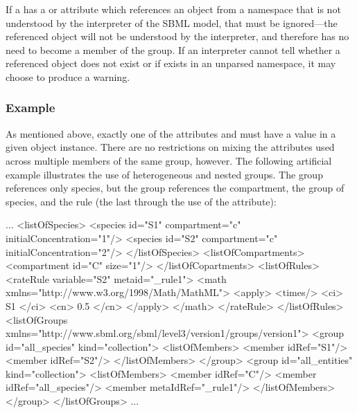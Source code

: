 If a \Member has a  or  attribute which references an object from a namespace that is not understood by the interpreter of the SBML model, that \Member must be ignored---the referenced object will not be understood by the interpreter, and therefore has no need to become a member of the group. If an interpreter cannot tell whether a referenced object does not exist or if exists in an unparsed namespace, it may choose to produce a warning.


\subsubsection{Example}

As mentioned above, exactly one of the attributes  and  must have a value in a given \Member object instance.  There are no restrictions on mixing the attributes used across multiple members of the same group, however.  The following artificial example illustrates the use of heterogeneous and nested groups.  The group  references only species, but the group  references the compartment, the group of species, and the rule (the last through the use of the  attribute):

\begin{example}
...
  <listOfSpecies>     
      <species id="S1" compartment="c" initialConcentration="1"/> 
      <species id="S2" compartment="c" initialConcentration="2"/> 
  </listOfSpecies>   
  <listOfCompartments>   
      <compartment id="C" size="1"/>
  </listOfCopartments>   
  <listOfRules>
      <rateRule variable="S2" metaid="_rule1">
          <math xmlns="http://www.w3.org/1998/Math/MathML">
              <apply>
                  <times/>
                  <ci> S1 </ci>
                  <cn> 0.5 </cn>
              </apply>
          </math>
      </rateRule>
  </listOfRules>
  <listOfGroups xmlns="http://www.sbml.org/sbml/level3/version1/groups/version1">   
      <group id="all_species" kind="collection">
          <listOfMembers>
              <member idRef="S1"/> 
              <member idRef="S2"/> 
          </listOfMembers>
      </group> 
      <group id="all_entities" kind="collection">
          <listOfMembers>
              <member idRef="C"/> 
              <member idRef="all_species"/> 
              <member metaIdRef="_rule1"/> 
          </listOfMembers>
      </group> 
  </listOfGroups>   
...
\end{example}


